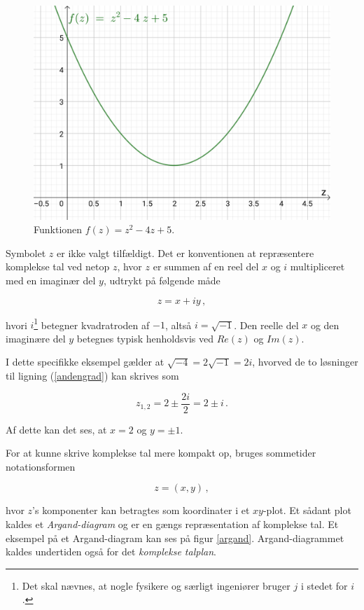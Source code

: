 \documentclass[a4paper, 12pt,titlepage]{article}
\begin{document}
\begin{figure}[htbp]
\centering
\includegraphics[width=.9\linewidth]{./img/fz_small.png}
\caption{\label{fz}Funktionen \(f(z) = z^2 -4z +5\).}
\end{figure}


Symbolet \(z\) er ikke valgt tilfældigt. Det er konventionen at repræsentere komplekse tal ved netop \(z\), hvor \(z\) er summen af en reel del \(x\) og \(i\) multipliceret med en imaginær del \(y\), udtrykt på følgende måde

$$z=x+i y \, ,$$

hvori \(i\)\footnote{Det skal nævnes, at nogle fysikere og særligt ingeniører bruger \(j\) i stedet for \(i\).} betegner kvadratroden af \(-1\), altså \(i=\sqrt{-1}\). Den reelle del \(x\) og den imaginære del \(y\) betegnes typisk henholdsvis ved \(Re(z)\) og \(Im(z)\). 

I dette specifikke eksempel gælder at \(\sqrt{-4} =2 \sqrt{-1} = 2 i\), hvorved de to løsninger til ligning (\ref{andengrad}) kan skrives som

$$z_{1,2} = 2 \pm \frac{2 i}{2} = 2 \pm i\,.$$

Af dette kan det ses, at \(x=2\) og \(y=\pm 1\).

For at kunne skrive komplekse tal mere kompakt op, bruges sommetider notationsformen

$$z = (x,y) \,,$$

hvor \(z\)'s komponenter kan betragtes som koordinater i et \(xy\)​-plot. Et sådant plot kaldes et \emph{Argand-diagram} og er en gængs repræsentation af komplekse tal. Et eksempel på et Argand-diagram kan ses på figur \ref{argand}. Argand-diagrammet kaldes undertiden også for det \emph{komplekse talplan}.
\end{document}

